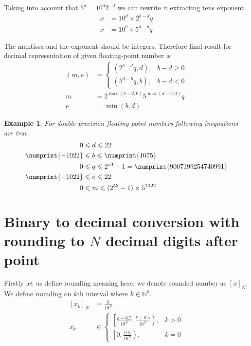\documentclass[english]{article}
\renewcommand{\leq}{\leqslant}
\renewcommand{\geq}{\geqslant}
\newtheorem{example}{Example}
\begin{document}
Taking into account that $5^d = 10^d 2^{-d}$ we can rewrite it extracting tens exponent.
\begin{align}
    x & = 10^d \times 2^{b-d} q \\
    x & = 10^b \times 5^{d-b}q
\end{align}

The mantissa and the exponent should be integers.
Therefore final result for decimal representation of given floating-point number is
\begin{align*}
    (m, e) & = \begin{cases}
        (2^{b-d} q, d), & b-d \geq 0 \\
        (5^{d-b} q, b), & b-d < 0
    \end{cases} \\
    m & = 2^{\max(b-d, 0)} 5^{\max(d-b, 0)} q \\
    e & = \min(b, d)
\end{align*}

\begin{example}
For double-precision floating-point numbers following inequations are true
    \begin{align*}
        0 & \leq d \leq 22 \\
        \numprint{-1022} & \leq b \leq \numprint{1075} \\
        0 & \leq q \leq 2^{53} - 1 = \numprint{9007199254740991} \\
        \numprint{-1022} & \leq e \leq 22 \\
        0 & \leq m \leq (2^{53} - 1) \times 5^{1022}
    \end{align*}
\end{example}

\section{Binary to decimal conversion with rounding to $N$ decimal digits after point}

Firstly let us define rounding meaning here, we denote rounded number as $\left[x \right]_{N}$.
We define rounding on $k$th interval where $k \in \mathbb{N}^0$.
\begin{align*}
    \left[x_k \right]_N & = \frac{k}{10^N} \\
    x_k & \in \begin{cases}
        \left[\frac{k-0.5}{10^N}, \frac{k+0.5}{10^N} \right), & k>0 \\
        \left[0, \frac{0.5}{10^N} \right), & k=0
    \end{cases}
\end{align*}
\end{document}
